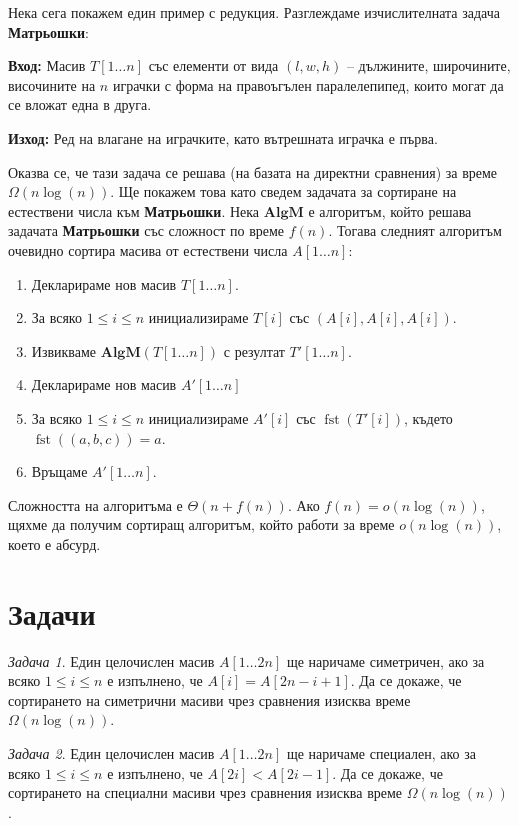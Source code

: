 \documentclass{article}
\theoremstyle{definition}
\theoremstyle{plain}
\theoremstyle{remark}
\newtheorem{problem}{Задача}
\theoremstyle{definition}
\begin{document}
Нека сега покажем един пример с редукция.
Разглеждаме изчислителната задача \textbf{Матрьошки}:

\textbf{Вход:} Масив $T[1 \dots n]$ със елементи от вида $(l, w, h)$ -- дължините, широчините, височините на $n$ играчки с форма на правоъгълен паралелепипед, които могат да се вложат една в друга.

\textbf{Изход:} Ред на влагане на играчките, като вътрешната играчка е първа.

Оказва се, че тази задача се решава (на базата на директни сравнения) за време $\Omega(n \log(n))$.
Ще покажем това като сведем задачата за сортиране на естествени числа към \textbf{Матрьошки}.
Нека $\mathbf{AlgM}$ е алгоритъм, който решава задачата \textbf{Матрьошки} със сложност по време $f(n)$.
Тогава следният алгоритъм очевидно сортира масива от естествени числа $A[1 \dots n]$:
\begin{enumerate}
    \item Декларираме нов масив $T[1 \dots n]$.
    \item За всяко $1 \leq i \leq n$ инициализираме $T[i]$ със $(A[i], A[i], A[i])$.
    \item Извикваме $\mathbf{AlgM}(T[1 \dots n])$ с резултат $T'[1 \dots n]$.
    \item Декларираме нов масив $A'[1 \dots n]$
    \item За всяко $1 \leq i \leq n$ инициализираме $A'[i]$ със $\operatorname{fst}(T'[i])$, където $\operatorname{fst}((a, b, c)) = a$.
    \item Връщаме $A'[1 \dots n]$.
\end{enumerate}
Сложността на алгоритъма е $\Theta(n + f(n))$.
Ако $f(n) = o(n \log(n))$, щяхме да получим сортиращ алгоритъм, който работи за време $o(n \log(n))$, което е абсурд.

\section*{Задачи}

\begin{problem}
Един целочислен масив $A[1 \dots 2n]$ ще наричаме симетричен, ако за всяко $1 \leq i \leq n$ е изпълнено, че $A[i] = A[2n - i + 1]$.
Да се докаже, че сортирането на симетрични масиви чрез сравнения изисква време $\Omega(n \log(n))$.
\end{problem}

\begin{problem}
Един целочислен масив $A[1 \dots 2n]$ ще наричаме специален, ако за всяко $1 \leq i \leq n$ е изпълнено, че $A[2i] < A[2i - 1]$.
Да се докаже, че сортирането на специални масиви чрез сравнения изисква време $\Omega(n \log(n))$.
\end{problem}
\end{document}

